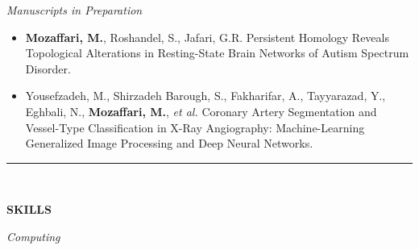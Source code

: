 \documentclass[12pt, b4paper]{cv}
\begin{document}
\textit{Manuscripts in Preparation}
\begin{itemize}
    \item \textbf{Mozaffari, M.}, Roshandel, S., Jafari, G.R.
    Persistent Homology Reveals Topological Alterations in Resting-State Brain Networks of Autism Spectrum Disorder.

    \item Yousefzadeh, M., Shirzadeh Barough, S., Fakharifar, A., Tayyarazad, Y., Eghbali, N., \textbf{Mozaffari, M.}, \textit{et al.}
    Coronary Artery Segmentation and Vessel-Type Classification in X-Ray Angiography: Machine-Learning Generalized Image Processing and Deep Neural Networks.

\end{itemize}


\pagebreak




\vspace{-0.15in}
\rule{\textwidth}{1pt}\\
\vspace{-0.15in}


{\Large \textbf{SKILLS}}
\vspace{5pt}

\textit{Computing}
\end{document}
